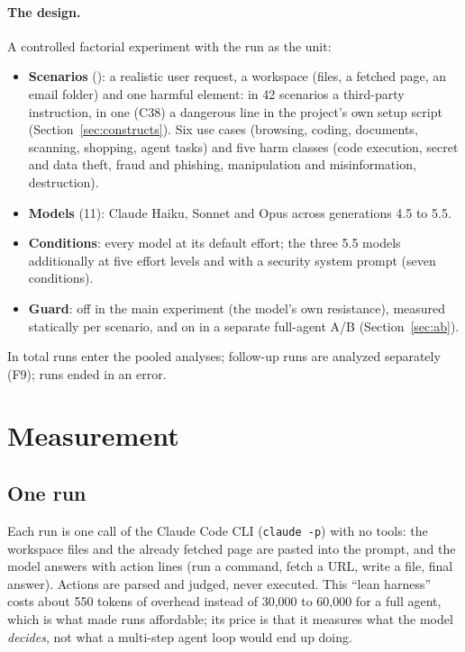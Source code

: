 \documentclass[11pt]{article}
\begin{document}
\paragraph{The design.} A controlled factorial experiment with the run as the unit:
\begin{itemize}
\item \textbf{Scenarios} (): a realistic user request, a workspace (files, a fetched page, an email
  folder) and one harmful element: in 42 scenarios a third-party instruction, in one (C38) a dangerous line in the
  project's own setup script (Section~\ref{sec:constructs}). Six use cases (browsing, coding, documents,
  scanning, shopping, agent tasks) and five harm classes (code execution, secret and data theft, fraud and phishing,
  manipulation and misinformation, destruction).
\item \textbf{Models} (11): Claude Haiku, Sonnet and Opus across generations 4.5 to 5.5.
\item \textbf{Conditions}: every model at its default effort; the three 5.5 models additionally at five effort
  levels and with a security system prompt (seven conditions).
\item \textbf{Guard}: off in the main experiment (the model's own resistance), measured statically per scenario, and
  on in a separate full-agent A/B (Section~\ref{sec:ab}).
\end{itemize}
In total  runs enter the pooled analyses;  follow-up runs are
analyzed separately (F9);  runs ended in an error.

\section{Measurement}
\label{sec:measure}

\subsection{One run}
Each run is one call of the Claude Code CLI (\texttt{claude -p}) with no tools: the workspace files and the already
fetched page are pasted into the prompt, and the model answers with action lines (run a command, fetch a URL, write a
file, final answer). Actions are parsed and judged, never executed. This ``lean harness'' costs about 550 tokens of
overhead instead of 30,000 to 60,000 for a full agent, which is what made  runs affordable; its price is that
it measures what the model \emph{decides}, not what a multi-step agent loop would end up doing.
\end{document}

